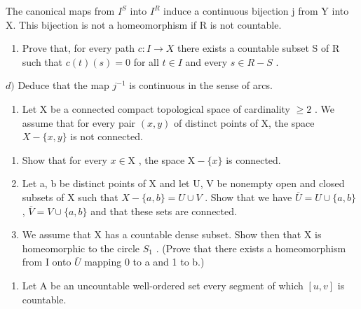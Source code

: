 The canonical maps from \(I^{S}\) into \(I^{R}\) induce a continuous bijection j from Y into X. This bijection is not a homeomorphism if R is not countable.

\begin{enumerate}
\def\labelenumi{\alph{enumi})}
\setcounter{enumi}{2}
\tightlist
\item
  Prove that, for every path \(c: I \to X\) there exists a countable subset S of R such that \(c(t)(s) = 0\) for all \(t \in I\) and every \(s \in R - S\) .
\end{enumerate}

\(d)\) Deduce that the map \(j^{-1}\) is continuous in the sense of arcs.

\begin{enumerate}
\def\labelenumi{\arabic{enumi})}
\setcounter{enumi}{7}
\tightlist
\item
  Let X be a connected compact topological space of cardinality \(\geqslant 2\) . We assume that for every pair \((x,y)\) of distinct points of X, the space \(X - \{x,y\}\) is not connected.
\end{enumerate}

\begin{enumerate}
\def\labelenumi{\alph{enumi})}
\item
  Show that for every \(x \in \mathrm{X}\) , the space \(\mathrm{X} - \{x\}\) is connected.
\item
  Let a, b be distinct points of X and let U, V be nonempty open and closed subsets of X such that \(X - \{a,b\}=U\cup V\) . Show that we have \(\overline{U} = U \cup \{a, b\}\) , \(\overline{V} = V \cup \{a, b\}\) and that these sets are connected.
\item
  We assume that X has a countable dense subset. Show then that X is homeomorphic to the circle \(S_{1}\) . (Prove that there exists a homeomorphism from I onto \(\overline{U}\) mapping 0 to a and 1 to b.)
\end{enumerate}

\begin{enumerate}
\def\labelenumi{\arabic{enumi})}
\setcounter{enumi}{8}
\tightlist
\item
  Let A be an uncountable well-ordered set every segment of which \([u, v]\) is countable.
\end{enumerate}

